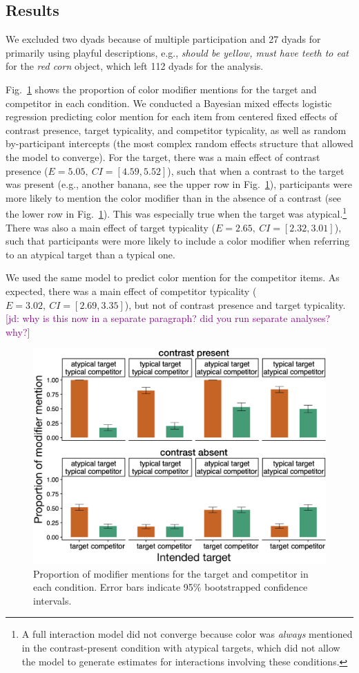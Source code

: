 \documentclass[10pt,letterpaper]{article}
\newcommand{\jd}[1]{\textcolor{Purple}{[jd: #1]}}
\newcommand{\figref}[1]{Fig.~\ref{#1}}
\begin{document}
\subsection{Results}
We excluded two dyads because of multiple participation and 27 dyads for primarily using playful descriptions, e.g., \textit{should be yellow, must have teeth to eat} for the \textit{red corn} object, which left 112 dyads for the analysis.

\figref{prod-results} shows the proportion of color modifier mentions for the target and competitor in each condition. We conducted a Bayesian mixed effects logistic regression predicting color mention for each item from centered fixed effects of contrast presence, target typicality, and competitor typicality, as well as random by-participant intercepts (the most complex random effects structure that allowed the model to converge).%
For the target, there was a main effect of contrast presence ($E=5.05,\ CI=[4.59,5.52]$), such that when a contrast to the target was present (e.g., another banana, see the upper row in \figref{prod-results}), participants were more likely to mention the color modifier than in the absence of a contrast (see the lower row in \figref{prod-results}). This was especially true when the target was atypical.\footnote{A full interaction model did not converge because color was \emph{always} mentioned in the contrast-present condition with atypical targets, which did not allow the model to generate estimates for interactions involving these conditions.} There was also a main effect of target typicality ($E=2.65,\ CI=[2.32,3.01]$), such that participants were more likely to include a color modifier when referring to an atypical target than a typical one.

We used the same model to predict color mention for the competitor items. As expected, there was a main effect of competitor typicality ($E=3.02,\ CI=[2.69,3.35]$), but not of contrast presence and target typicality.\jd{why is this now in a separate paragraph? did you run separate analyses? why?}

\begin{figure}
	\begin{center}
		\includegraphics[width=.475\textwidth]{graphs/prod-bycond-paper.pdf}
	\end{center}
\caption{Proportion of modifier mentions for the target and competitor in each condition. Error bars indicate 95\% bootstrapped confidence intervals.} 
\label{prod-results}
\end{figure}
\end{document}
